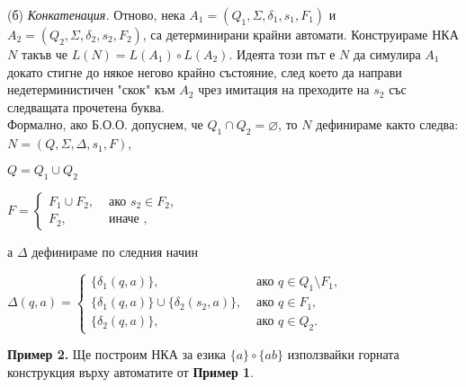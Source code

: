 \documentclass[openany]{book}
\begin{document}
    \vspace{15pt}
    
    (б) \textit{Конкатенация.} Отново, нека $A_1 = (Q_1,\Sigma,\delta_1,s_1,F_1)$ и \\
    $A_2 = (Q_2,\Sigma,\delta_2,s_2,F_2)$, са детерминирани крайни автомати. Конструираме
    НКА $N$ такъв че $L(N) = L(A_1) \circ L(A_2)$. Идеята този път е $N$ да симулира $A_1$
    докато стигне до някое негово крайно състояние, след което да направи
    недетерминистичен "скок" \hspace{0.1cm} към $A_2$ чрез имитация на преходите
    на $s_2$ със следващата прочетена буква. \\
    \hspace{15pt} Формално, ако Б.О.О.
    допуснем, че $Q_1 \cap Q_2 = \varnothing$, то $N$ дефинираме както следва:
         $N = (Q,\Sigma,\Delta,s_1,F)$,
         \begin{center}
            $Q = Q_1 \cup Q_2$ \\
         \end{center}
    
         \begin{center}
          $F = 
          \begin{cases}
           F_1 \cup F_2, & \text { ако } s_2 \in F_2, \\
           F_2, & \text { иначе },
          \end{cases}$
         \end{center} 
          
         а $\Delta$ дефинираме по следния начин
    
         \begin{center}
            $\Delta(q,a) =
            \begin{cases}
              \{\delta_1(q,a)\}, & \text { ако } q \in Q_1 \setminus F_1, \\
              \{\delta_1(q,a)\} \cup \{\delta_2(s_2,a)\}, & \text { ако } q \in F_1, \\
              \{\delta_2(q,a)\}, & \text { ако } q \in Q_2.
            \end{cases}$
         \end{center}
    
    
    \vspace{15pt}
    
    \textbf{Пример 2.} Ще построим НКА за езика $\{a\} \circ \{ab\}$ използвайки 
    горната конструкция върху автоматите от \textbf{Пример 1}.
    \vspace{25pt}
    
\end{document}

